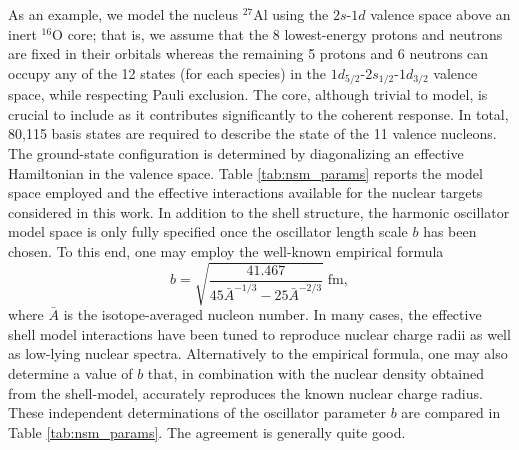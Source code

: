 \documentclass[12pt,letterpaper]{book}
\begin{document}
As an example, we model the nucleus $^{27}$Al using the $2s$-$1d$ valence space above an inert $^{16}$O core; that is, we assume that the 8 lowest-energy protons and neutrons are fixed in their orbitals whereas the remaining 5 protons and 6 neutrons can occupy any of the 12 states (for each species) in the $1d_{5/2}$-$2s_{1/2}$-$1d_{3/2}$ valence space, while respecting Pauli exclusion. The core, although trivial to model, is crucial to include as it contributes significantly to the coherent response. In total, 80,115 basis states are required to describe the state of the 11 valence nucleons. The ground-state configuration is determined by diagonalizing an effective Hamiltonian in the valence space. Table \ref{tab:nsm_params} reports the model space employed and the effective interactions available for the nuclear targets considered in this work. In addition to the shell structure, the harmonic oscillator model space is only fully specified once the oscillator length scale $b$ has been chosen. To this end, one may employ the well-known empirical formula
\begin{equation}
b=\sqrt{\frac{41.467}{45\bar{A}^{-1/3}-25\bar{A}^{-2/3}}}\;\mathrm{fm},
\label{eq:b_empirical}
\end{equation}
where $\bar{A}$ is the isotope-averaged nucleon number. In many cases, the effective shell model interactions have been tuned to reproduce nuclear charge radii as well as low-lying nuclear spectra. Alternatively to the empirical formula, one may also determine a value of $b$ that, in combination with the nuclear density obtained from the shell-model, accurately reproduces the known nuclear charge radius. These independent determinations of the oscillator parameter $b$ are compared in Table \ref{tab:nsm_params}. The agreement is generally quite good.
\end{document}

